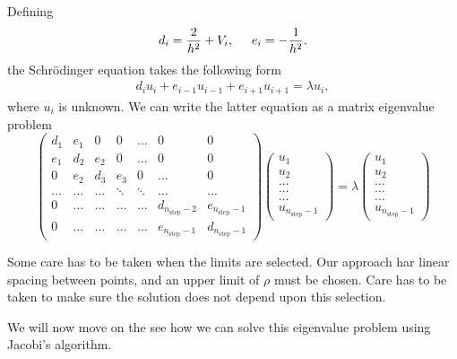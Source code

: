 \documentclass[11pt,a4paper,english,final]{article}
\numberwithin{equation}{section}
\begin{document}
Defining 
\begin{gather}
   d_i=\frac{2}{h^2}+V_i, \hspace{0.5cm } e_i=-\frac{1}{h^2}.
\end{gather}
the Schrödinger equation takes the following form
\begin{gather}
d_iu_i+e_{i-1}u_{i-1}+e_{i+1}u_{i+1}  = \lambda u_i,
\end{gather}
where $u_i$ is unknown. We can write the 
latter equation as a matrix eigenvalue problem 
\begin{equation}
\begin{pmatrix} d_1 & e_1 & 0   & 0    & \dots  &0     & 0 \\
                e_1 & d_2 & e_2 & 0    & \dots  &0     &0 \\
                0   & e_2 & d_3 & e_3  &0       &\dots & 0\\
        \dots  & \dots & \dots & \ddots  &\ddots      &\dots & \dots\\
 0   & \dots & \dots & \dots  &\dots  &d_{n_{\mathrm{step}}-2} & e_{n_{\mathrm{step}}-1}\\
 0   & \dots & \dots & \dots  &\dots       &e_{n_{\mathrm{step}}-1} & d_{n_{\mathrm{step}}-1}
             \end{pmatrix}
\begin{pmatrix} u_{1} \\
      u_{2} \\
      \dots\\ \dots\\ \dots\\
      u_{n_{\mathrm{step}}-1}
\end{pmatrix} 
= \lambda \begin{pmatrix} u_{1} \\
                          u_{2} \\
                          \dots\\ \dots\\ \dots\\
                          u_{n_{\mathrm{step}}-1}
             \end{pmatrix} 
      \label{eq:sematrix}
\end{equation} 

Some care has to be taken when the limits are selected. Our 
approach har linear spacing between points, and an upper limit 
of $\rho$ must be chosen. Care has to be taken to make sure the 
solution does not depend upon this selection.

We will now move on the see how we can solve this eigenvalue problem using Jacobi's algorithm. 
\end{document}
